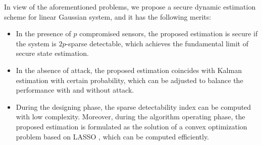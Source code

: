 \documentclass[12pt]{article}  %
\begin{document}
In view of the aforementioned problems, we propose a secure dynamic estimation scheme for linear Gaussian system, and it has the following merits:
\begin{itemize}[left=0pt]
	\item In the presence of $p$ compromised sensors, the proposed estimation is secure if the system is $2p$-sparse detectable, which achieves the fundamental limit of secure state estimation.
	\item In the absence of attack, the proposed estimation coincides with Kalman estimation with certain probability, which can be adjusted to balance the performance with and without attack.
	\item During the designing phase, the sparse detectability index can be computed with low complexity. Moreover, during the algorithm operating phase, the proposed estimation is formulated as the solution of a convex optimization problem based on LASSO \cite{LASSOTibshirani}, which can be computed efficiently.
\end{itemize}



\end{document}
